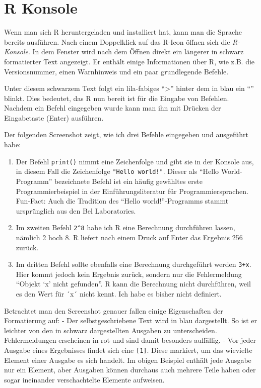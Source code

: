 \documentclass[
]{book}
\begin{document}
\hypertarget{r-konsole}{%
\section{R Konsole}\label{r-konsole}}

Wenn man sich R heruntergeladen und installiert hat, kann man die Sprache bereits ausführen.
Nach einem Doppelklick auf das R-Icon öffnen sich die \emph{R-Konsole}.
In dem Fenster wird nach dem Öffnen direkt ein längerer in schwarz formatierter Text angezeigt.
Er enthält einige Informationen über R, wie z.B. die Versionsnummer, einen Warnhinweis und ein paar grundlegende Befehle.

Unter diesem schwarzem Text folgt ein lila-fabiges ``\textgreater{}'' hinter dem in blau ein ``\textbar{}'' blinkt.
Dies bedeutet, das R nun bereit ist für die Eingabe von Befehlen. Nachdem ein Befehl eingegeben wurde kann man ihn mit Drücken der Eingabetaste (Enter) ausführen.

Der folgenden Screenshot zeigt, wie ich drei Befehle eingegeben und ausgeführt habe:

\begin{enumerate}
\def\labelenumi{\arabic{enumi}.}
\item
  Der Befehl \texttt{print()} nimmt eine Zeichenfolge und gibt sie in der Konsole aus, in diesem Fall die Zeichenfolge \texttt{"Hello\ world!"}.
  Dieser als ``Hello World-Programm'' bezeichnete Befehl ist ein häufig gewähltes erste Programmierbeispiel in der Einführungsliteratur für Programmiersprachen. Fun-Fact: Auch die Tradition des ``Hello world!''-Programms stammt ursprünglich aus den Bel Laboratories.
\item
  Im zweiten Befehl \texttt{2\^{}8} habe ich R eine Berechnung durchführen lassen, nämlich 2 hoch 8.
  R liefert nach einem Druck auf Enter das Ergebnis 256 zurück.
\item
  Im dritten Befehl sollte ebenfalls eine Berechnung durchgeführt werden \texttt{3+x}.
  Hier kommt jedoch kein Ergebnis zurück, sondern nur die Fehlermeldung ``Objekt `x' nicht gefunden''.
  R kann die Berechnung nicht durchführen, weil es den Wert für ´x´ nicht kennt.
  Ich habe es bisher nicht definiert.
\end{enumerate}

Betrachtet man den Screenshot genauer fallen einige Eigenschaften der Formatierung auf:
- Der selbstgeschriebene Text wird in blau dargestellt. So ist er leichter von den in schwarz dargestellten Ausgaben zu unterscheiden. Fehlermeldungen erscheinen in rot und sind damit besonders auffällig.
- Vor jeder Ausgabe eines Ergebnisses findet sich eine \texttt{{[}1{]}}. Diese markiert, um das wievielte Element einer Ausgabe es sich handelt.
Im obigen Beispiel enthält jede Ausgabe nur ein Element, aber Ausgaben können durchaus auch mehrere Teile haben oder sogar ineinander verschachtelte Elemente aufweisen.
\end{document}
